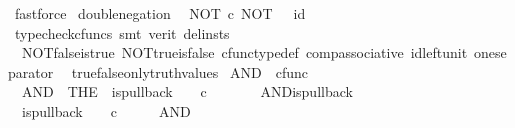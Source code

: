 \begin{isabellebody}
\ fastforce%
\endisatagproof
{\isafoldproof}%
%
\isadelimproof
\isanewline
%
\endisadelimproof
\isanewline
{}\isamarkupfalse%
\ double{\isacharunderscore}{\kern0pt}negation{\isacharcolon}{\kern0pt}\isanewline
\ \ {\isachardoublequoteopen}NOT\ {\isasymcirc}\isactrlsub c\ NOT\ {\isacharequal}{\kern0pt}\ \ id\ {\isasymOmega}{\isachardoublequoteclose}\isanewline
%
\isadelimproof
\ \ %
\endisadelimproof
%
\isatagproof
{}\isamarkupfalse%
\ {\isacharparenleft}{\kern0pt}typecheck{\isacharunderscore}{\kern0pt}cfuncs{\isacharcomma}{\kern0pt}\ smt\ {\isacharparenleft}{\kern0pt}verit{\isacharcomma}{\kern0pt}\ del{\isacharunderscore}{\kern0pt}insts{\isacharparenright}{\kern0pt}\ \isanewline
\ \ NOT{\isacharunderscore}{\kern0pt}false{\isacharunderscore}{\kern0pt}is{\isacharunderscore}{\kern0pt}true\ NOT{\isacharunderscore}{\kern0pt}true{\isacharunderscore}{\kern0pt}is{\isacharunderscore}{\kern0pt}false\ cfunc{\isacharunderscore}{\kern0pt}type{\isacharunderscore}{\kern0pt}def\ comp{\isacharunderscore}{\kern0pt}associative\ id{\isacharunderscore}{\kern0pt}left{\isacharunderscore}{\kern0pt}unit{}\ one{\isacharunderscore}{\kern0pt}separator\isanewline
\ \ true{\isacharunderscore}{\kern0pt}false{\isacharunderscore}{\kern0pt}only{\isacharunderscore}{\kern0pt}truth{\isacharunderscore}{\kern0pt}values{\isacharparenright}{\kern0pt}%
\endisatagproof
{\isafoldproof}%
%
\isadelimproof
%
\endisadelimproof
%
\isadelimdocument
%
\endisadelimdocument
%
\isatagdocument
%
\isamarkuptrue%
%
\endisatagdocument
{\isafolddocument}%
%
\isadelimdocument
%
\endisadelimdocument
{}\isamarkupfalse%
\ AND\ {\isacharcolon}{\kern0pt}{\isacharcolon}{\kern0pt}\ {\isachardoublequoteopen}cfunc{\isachardoublequoteclose}\ \isanewline
\ \ {\isachardoublequoteopen}AND\ {\isacharequal}{\kern0pt}\ {\isacharparenleft}{\kern0pt}THE\ {\isasymchi}{\isachardot}{\kern0pt}\ is{\isacharunderscore}{\kern0pt}pullback\ {\isasymone}\ {\isasymone}\ {\isacharparenleft}{\kern0pt}{\isasymOmega}\ {\isasymtimes}\isactrlsub c\ {\isasymOmega}{\isacharparenright}{\kern0pt}\ {\isasymOmega}\ {\isacharparenleft}{\kern0pt}{\isasymbeta}\isactrlbsub {\isasymone}\isactrlesub {\isacharparenright}{\kern0pt}\ {\isasymt}\ {\isasymlangle}{\isasymt}{\isacharcomma}{\kern0pt}{\isasymt}{\isasymrangle}\ {\isasymchi}{\isacharparenright}{\kern0pt}{\isachardoublequoteclose}\isanewline
\isanewline
{}\isamarkupfalse%
\ AND{\isacharunderscore}{\kern0pt}is{\isacharunderscore}{\kern0pt}pullback{\isacharcolon}{\kern0pt}\isanewline
\ \ {\isachardoublequoteopen}is{\isacharunderscore}{\kern0pt}pullback\ {\isasymone}\ {\isasymone}\ {\isacharparenleft}{\kern0pt}{\isasymOmega}\ {\isasymtimes}\isactrlsub c\ {\isasymOmega}{\isacharparenright}{\kern0pt}\ {\isasymOmega}\ {\isacharparenleft}{\kern0pt}{\isasymbeta}\isactrlbsub {\isasymone}\isactrlesub {\isacharparenright}{\kern0pt}\ {\isasymt}\ {\isasymlangle}{\isasymt}{\isacharcomma}{\kern0pt}{\isasymt}{\isasymrangle}\ AND{\isachardoublequoteclose}\isanewline

\end{isabellebody}
